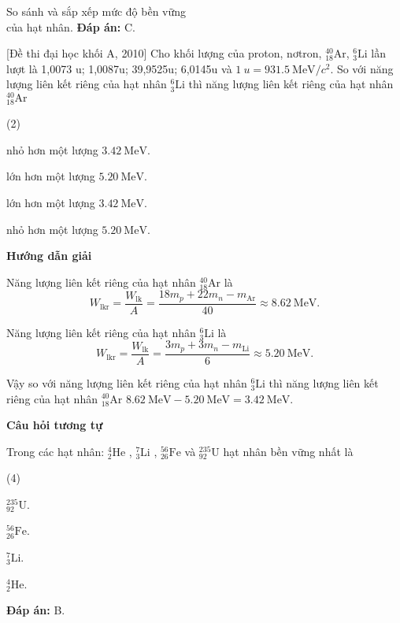 \begin{dang}{So sánh và sắp xếp mức độ bền vững\\ của hạt nhân.}
{		\textbf{Đáp án:} C.
	}
	
	{[Đề thi đại học khối A, 2010] Cho khối lượng của proton, nơtron, $^{40}_{18}\text{Ar}$, $^{6}_{3}\text{Li}$ lần lượt là 1,0073 u; 1,0087u; 39,9525u; 6,0145u và $\SI{1}{u}=\SI{931,5}{\mega\electronvolt/c^2}$. So với năng lượng liên kết riêng của hạt nhân $^{6}_{3}\text{Li}$ thì năng lượng liên kết riêng của hạt nhân $^{40}_{18}\text{Ar}$
		\begin{mcq}(2)
			\item nhỏ hơn một lượng $\SI{3,42}{\mega\electronvolt}$.
			\item lớn hơn một lượng $\SI{5,20}{\mega\electronvolt}$.
			\item lớn hơn một lượng $\SI{3,42}{\mega\electronvolt}$.
			\item nhỏ hơn một lượng $\SI{5,20}{\mega\electronvolt}$.
	\end{mcq}}
	{
		\begin{center}
			\textbf{Hướng dẫn giải}
		\end{center}
		
		Năng lượng liên kết riêng của hạt nhân $^{40}_{18}\text{Ar}$ là
		\begin{equation*}
			W_\text{lkr}=\dfrac{W_\text{lk}}{A}= \dfrac{18 m_p+ 22 m_n - m_\text{Ar}}{40}\approx \SI{8,62}{\mega\electronvolt}.
		\end{equation*}
		
		Năng lượng liên kết riêng của hạt nhân $^{6}_{3}\text{Li}$ là
		\begin{equation*}
			W_\text{lkr}=\dfrac{W_\text{lk}}{A}= \dfrac{3 m_p+ 3 m_n - m_\text{Li}}{6}\approx \SI{5,20}{\mega\electronvolt}.
		\end{equation*}
		
		Vậy so với năng lượng liên kết riêng của hạt nhân $^{6}_{3}\text{Li}$ thì năng lượng liên kết riêng của hạt nhân $^{40}_{18}\text{Ar}$ $\SI{8,62}{\mega\electronvolt} - \SI{5,20}{\mega\electronvolt} = \SI{3,42}{\mega\electronvolt}.$
		
		\begin{center}
			\textbf{Câu hỏi tương tự}
		\end{center}
		
		Trong các hạt nhân: $ ^{4}_{2} \text{He} $ , $ ^{7}_{3} \text{Li} $ , $ ^{56}_{26} \text{Fe} $ và $ ^{235}_{92} \text{U} $ hạt nhân bền vững nhất là
		\begin{mcq}(4)
			\item $ ^{235}_{92} \text{U} $.
			\item $ ^{56}_{26} \text{Fe} $.
			\item $ ^{7}_{3} \text{Li} $.
			\item $ ^{4}_{2} \text{He} $.
		\end{mcq}
		
		\textbf{Đáp án:} B.
	}
	
\end{dang}
